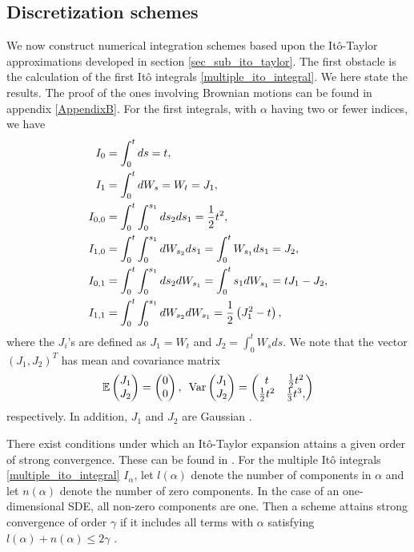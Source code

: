 \subsection{Discretization schemes}
We now construct numerical integration schemes based upon the Itô-Taylor approximations developed in section \ref{sec_sub_ito_taylor}.
The first obstacle is the calculation of the first Itô integrals \eqref{multiple_ito_integral}.
We here state the results. 
The proof of the ones involving Brownian motions can be found in appendix \ref{AppendixB}.
For the first integrals, with $\alpha$ having two or fewer indices, we have
\begin{align}\label{solved_ito_integrals}
I_0&=\int_{0}^{t}ds=t,\notag\\
I_1&=\int_{0}^{t}dW_s=W_t=J_1,\notag\\
I_{0,0}&=\int_{0}^{t}\int_{0}^{s_1}ds_2ds_1=\frac{1}{2}t^2,\notag\\
I_{1,0}&=\int_{0}^{t}\int_{0}^{s_1}dW_{s_2}ds_1=\int_{0}^{t}W_{s_1}ds_1=J_2,\notag\\
I_{0,1}&=\int_{0}^{t}\int_{0}^{s_1}ds_2dW_{s_1}=\int_{0}^{t}s_1dW_{s_1}=tJ_1-J_2,\notag\\
I_{1,1}&=\int_{0}^{t}\int_{0}^{s_1}dW_{s_2}dW_{s_1}=\frac{1}{2}\left(J_1^2-t\right),
\end{align}
where the $J_i$'s are defined as $J_1=W_t$ and $J_2=\int_0^tW_sds$.
We note that the vector $\left( J_1,J_2 \right)^T$ has mean and covariance matrix
\begin{align}
\mathbb{E} \begin{pmatrix}
J_1\\J_2
\end{pmatrix} =
\begin{pmatrix}
0\\
0
\end{pmatrix},\,\,\,
\mathrm{Var} \begin{pmatrix}
J_1\\J_2
\end{pmatrix} =
\begin{pmatrix}
t & \frac{1}{2}t^2\\
\frac{1}{2}t^2 & \frac{1}{3}t^3, 
\end{pmatrix}
\end{align}
respectively. In addition, $J_1$ and $J_2$ are Gaussian \citep{preston2012approximation}.

There exist conditions under which an Itô-Taylor expansion attains a given order of strong convergence. 
These can be found in \citet[chapter 5]{kloeden1992numerical}. 
For the multiple Itô integrals \ref{multiple_ito_integral} $I_\alpha$, let $l(\alpha)$ denote the number of components in $\alpha$ and let $n(\alpha)$ denote the number of zero components. In the case of an one-dimensional SDE, all non-zero components are one. Then a scheme attains strong convergence of order $\gamma$ if it includes all terms with $\alpha$ satisfying $l(\alpha)+n(\alpha)\leq 2\gamma$ \citep{preston2012approximation}.

